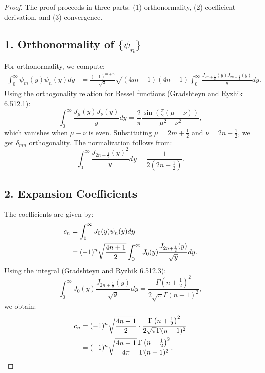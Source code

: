 \documentclass{article}
\begin{document}
\begin{proof}
The proof proceeds in three parts: (1) orthonormality, (2) coefficient derivation, and (3) convergence.

\subsection*{1. Orthonormality of $\{\psi_n\}$}
For orthonormality, we compute:
\begin{align}
\int_0^\infty \psi_m(y)\psi_n(y) dy &= \frac{(-1)^{m+n}}{\sqrt{\pi}} \sqrt{(4m+1)(4n+1)} \int_0^\infty \frac{J_{2m+\frac{1}{2}}(y) J_{2n+\frac{1}{2}}(y)}{y} dy.
\end{align}
Using the orthogonality relation for Bessel functions (Gradshteyn and Ryzhik 6.512.1):
\begin{equation}
\int_0^\infty \frac{J_\mu(y)J_\nu(y)}{y} dy = \frac{2}{\pi} \frac{\sin\left(\frac{\pi}{2}(\mu-\nu)\right)}{\mu^2-\nu^2},
\end{equation}
which vanishes when $\mu-\nu$ is even. Substituting $\mu=2m+\frac{1}{2}$ and $\nu=2n+\frac{1}{2}$, we get $\delta_{mn}$ orthogonality. The normalization follows from:
\begin{equation}
\int_0^\infty \frac{J_{2n+\frac{1}{2}}(y)^2}{y} dy = \frac{1}{2(2n+\frac{1}{2})}.
\end{equation}

\subsection*{2. Expansion Coefficients}
The coefficients are given by:
\begin{align}
c_n &= \int_0^\infty J_0(y)\psi_n(y) dy \notag \\
&= (-1)^n \sqrt{\frac{4n+1}{2}} \int_0^\infty J_0(y) \frac{J_{2n+\frac{1}{2}}(y)}{\sqrt{y}} dy.
\end{align}
Using the integral (Gradshteyn and Ryzhik 6.512.3):
\begin{equation}
\int_0^\infty J_0(y)\frac{J_{2n+\frac{1}{2}}(y)}{\sqrt{y}} dy = \frac{\Gamma\left(n+\frac{1}{2}\right)^2}{2\sqrt{\pi}\Gamma(n+1)^2},
\end{equation}
we obtain:
\begin{align}
c_n &= (-1)^n \sqrt{\frac{4n+1}{2}} \cdot \frac{\Gamma\left(n+\frac{1}{2}\right)^2}{2\sqrt{\pi}\Gamma(n+1)^2} \notag \\
&= (-1)^n \sqrt{\frac{4n+1}{4\pi}} \frac{\Gamma\left(n+\frac{1}{2}\right)^2}{\Gamma(n+1)^2}.
\end{align}


\end{proof}
\end{document}
